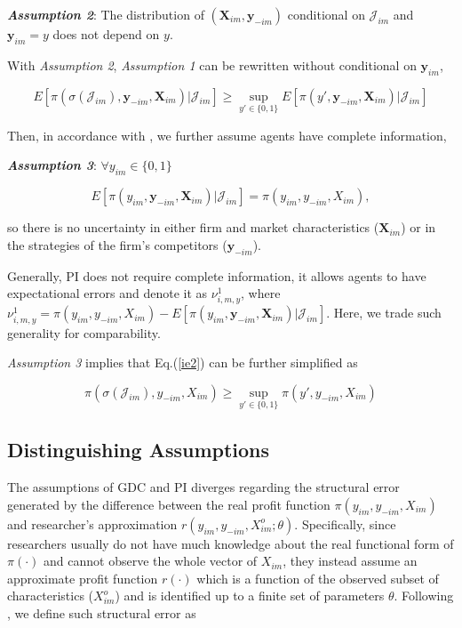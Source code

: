 \documentclass[a4paper]{article}
\begin{document}
\bigskip

\textbf{\textit{Assumption 2}}: The distribution of $(\textbf{X}_{im},\textbf{y}_{-im})$ conditional on $\mathcal{J}_{im}$ and $\textbf{y}_{im}=y$ does not depend on $y$.

\bigskip

With \textit{Assumption 2}, \textit{Assumption 1} can be rewritten without conditional on $\textbf{y}_{im}$,

\begin{equation}
E[\pi(\sigma(\mathcal{J}_{im}),\textbf{y}_{-im},\textbf{X}_{im})|\mathcal{J}_{im}]\geq \sup_{y'\in \{0,1\}} E[\pi(y',\textbf{y}_{-im},\textbf{X}_{im})|\mathcal{J}_{im}]
\label{ie2}
\end{equation}
 
Then, in accordance with \cite{ciliberto2009market}, we further assume agents have complete information,

\bigskip

\textbf{\textit{Assumption 3}}: $\forall y_{im} \in \{0,1\}$

$$E[\pi(y_{im},\textbf{y}_{-im},\textbf{X}_{im})|\mathcal{J}_{im}]=\pi(y_{im},y_{-im},X_{im}),$$

so there is no uncertainty in either firm and market characteristics ($\textbf{X}_{im}$) or in the strategies of the firm's competitors ($\textbf{y}_{-im}$). 

Generally, PI does not require complete information, it allows agents to have expectational errors and denote it as $\nu^1_{i,m,y}$, where $\nu^1_{i,m,y}=\pi(y_{im},y_{-im},X_{im})-E[\pi(y_{im},\textbf{y}_{-im},\textbf{X}_{im})|\mathcal{J}_{im}]$. Here, we trade such generality for comparability.

\textit{Assumption 3} implies that Eq.(\ref{ie2}) can be further simplified as 

\begin{equation}
\pi(\sigma(\mathcal{J}_{im}),y_{-im},X_{im}) \geq \sup_{y'\in \{0,1\}} \pi(y',y_{-im},X_{im})
\label{ie3}
\end{equation}

\subsection{Distinguishing Assumptions}

The assumptions of GDC and PI diverges regarding the structural error generated by the difference between the real profit function $\pi(y_{im},y_{-im},X_{im})$ and researcher's approximation $r(y_{im},y_{-im},X^o_{im}; \theta)$. Specifically, since researchers usually do not have much knowledge about the real functional form of $\pi(\cdot)$ and cannot observe the whole vector of $X_{im}$, they instead assume an approximate profit function $r(\cdot)$ which is a function of the observed subset of characteristics ($X^o_{im}$) and is identified up to a finite set of parameters $\theta$. Following \cite{pakes2015moment}, we define such structural error as
\end{document}
